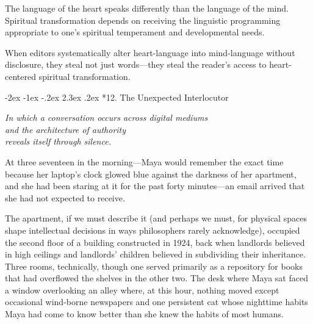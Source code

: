 \documentclass[12pt,twoside]{book}
\makeatletter
\def\cleardoublepage{\clearpage\if@twoside \ifodd\c@page\else\hbox{}\thispagestyle{empty}\newpage\if@twocolumn\hbox{}\newpage\fi\fi\fi}
\renewcommand\section{\@startsection{section}{1}{\z@}%
{-2ex \@plus -1ex \@minus -.2ex}%
{2.3ex \@plus.2ex}%
{\normalfont\Large\bfseries}}
\makeatother
\begin{document}
The language of the heart speaks differently than the language of the mind. Spiritual transformation depends on receiving the linguistic programming appropriate to one's spiritual temperament and developmental needs.

When editors systematically alter heart-language into mind-language without disclosure, they steal not just words—they steal the reader's access to heart-centered spiritual transformation.

\cleardoublepage
\vspace*{0.20\textheight}
\section*{12. The Unexpected Interlocutor}
\thispagestyle{chapterpage}

{\centering\itshape In which a conversation occurs across digital mediums\\and the architecture of authority\\reveals itself through silence.\par}
\vspace{0.3cm}

\normalfont\justifying
At three seventeen in the morning—Maya would remember the exact time because her laptop's clock glowed blue against the darkness of her apartment, and she had been staring at it for the past forty minutes—an email arrived that she had not expected to receive.

The apartment, if we must describe it (and perhaps we must, for physical spaces shape intellectual decisions in ways philosophers rarely acknowledge), occupied the second floor of a building constructed in 1924, back when landlords believed in high ceilings and landlords' children believed in subdividing their inheritance. Three rooms, technically, though one served primarily as a repository for books that had overflowed the shelves in the other two. The desk where Maya sat faced a window overlooking an alley where, at this hour, nothing moved except occasional wind-borne newspapers and one persistent cat whose nighttime habits Maya had come to know better than she knew the habits of most humans.
\end{document}

